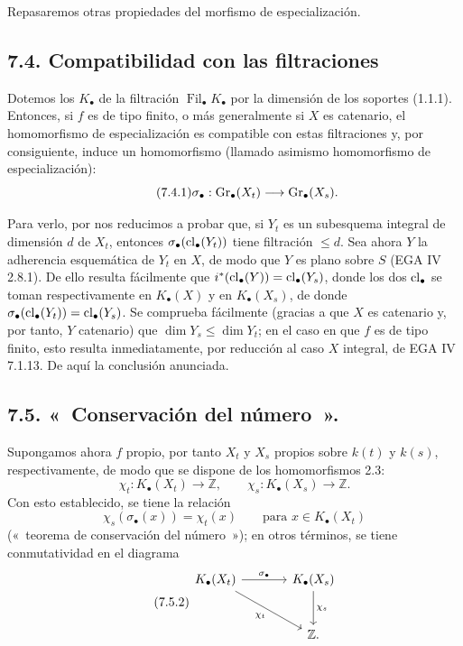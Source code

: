 Repasaremos otras propiedades del morfismo de especialización.

\subsection*{7.4. Compatibilidad con las filtraciones}
Dotemos los \(K_\bullet\) de la filtración \(\operatorname{Fil}_\bullet K_\bullet\) por la dimensión de los soportes (1.1.1). Entonces, si \(f\) es de tipo finito, o más generalmente si \(X\) es catenario, el homomorfismo de especialización es compatible con estas filtraciones y, por consiguiente, induce un homomorfismo (llamado asimismo homomorfismo de especialización):
\begin{equation}\tag{7.4.1}
  \sigma_\bullet:\operatorname{Gr}_\bullet(X_t)\longrightarrow \operatorname{Gr}_\bullet(X_s).
\end{equation}

Para verlo, por  nos reducimos a probar que, si \(Y_t\) es un subesquema integral de dimensión \(d\) de \(X_t\), entonces \(\sigma_\bullet(\operatorname{cl}_\bullet(Y_t))\) tiene filtración \(\leq d\). Sea ahora \(Y\) la adherencia esquemática de \(Y_t\) en \(X\), de modo que \(Y\) es plano sobre \(S\) (EGA IV 2.8.1). De ello resulta fácilmente que \(i^*(\operatorname{cl}_\bullet(Y))=\operatorname{cl}_\bullet(Y_s)\), donde los dos \(\operatorname{cl}_\bullet\) se toman respectivamente en \(K_\bullet(X)\) y en \(K_\bullet(X_s)\), de donde \(\sigma_\bullet(\operatorname{cl}_\bullet(Y_t))=\operatorname{cl}_\bullet(Y_s)\). Se comprueba fácilmente (gracias a que \(X\) es catenario y, por tanto, \(Y\) catenario) que \(\dim Y_s\leq \dim Y_t\); en el caso en que \(f\) es de tipo finito, esto resulta inmediatamente, por reducción al caso \(X\) integral, de EGA IV 7.1.13. De aquí la conclusión anunciada. %

\subsection*{7.5. «~Conservación del número~».}
Supongamos ahora \(f\) propio, por tanto \(X_t\) y \(X_s\) propios sobre \(k(t)\) y \(k(s)\), respectivamente, de modo que se dispone de los homomorfismos 2.3:
\[
  \chi_t:K_\bullet(X_t)\longrightarrow \mathbb Z,\qquad
  \chi_s:K_\bullet(X_s)\longrightarrow \mathbb Z .
\]
Con esto establecido, se tiene la relación
\begin{equation}\tag{7.5.1}
  \chi_s(\sigma_\bullet(x))=\chi_t(x)\qquad\text{para } x\in K_\bullet(X_t)
\end{equation}
(«~teorema de conservación del número~»); en otros términos, se tiene conmutatividad en el diagrama
\begin{equation}\tag{7.5.2}
\begin{tikzcd}[column sep=large,row sep=large]
K_\bullet(X_t) \arrow[r,"\sigma_\bullet"] \arrow[dr,"\chi_t"'] &
K_\bullet(X_s) \arrow[d,"\chi_s"]\\
& \mathbb Z .
\end{tikzcd}
\end{equation}

